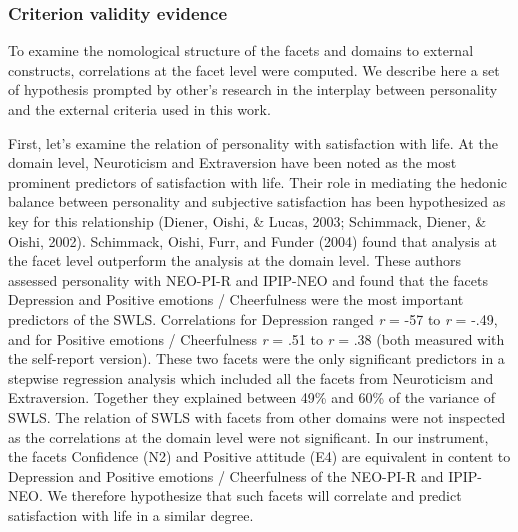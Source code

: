 \documentclass[,man]{apa6}
\theoremstyle{definition}
\theoremstyle{definition}
\theoremstyle{definition}
\theoremstyle{remark}
\begin{document}
\hypertarget{criterion-validity-evidence}{%
\subsubsection{Criterion validity
evidence}\label{criterion-validity-evidence}}

To examine the nomological structure of the facets and domains to
external constructs, correlations at the facet level were computed. We
describe here a set of hypothesis prompted by other's research in the
interplay between personality and the external criteria used in this
work.

First, let's examine the relation of personality with satisfaction with
life. At the domain level, Neuroticism and Extraversion have been noted
as the most prominent predictors of satisfaction with life. Their role
in mediating the hedonic balance between personality and subjective
satisfaction has been hypothesized as key for this relationship (Diener,
Oishi, \& Lucas, 2003; Schimmack, Diener, \& Oishi, 2002). Schimmack,
Oishi, Furr, and Funder (2004) found that analysis at the facet level
outperform the analysis at the domain level. These authors assessed
personality with NEO-PI-R and IPIP-NEO and found that the facets
Depression and Positive emotions / Cheerfulness were the most important
predictors of the SWLS. Correlations for Depression ranged \emph{r} =
-57 to \emph{r} = -.49, and for Positive emotions / Cheerfulness
\emph{r} = .51 to \emph{r} = .38 (both measured with the self-report
version). These two facets were the only significant predictors in a
stepwise regression analysis which included all the facets from
Neuroticism and Extraversion. Together they explained between 49\% and
60\% of the variance of SWLS. The relation of SWLS with facets from
other domains were not inspected as the correlations at the domain level
were not significant. In our instrument, the facets Confidence (N2) and
Positive attitude (E4) are equivalent in content to Depression and
Positive emotions / Cheerfulness of the NEO-PI-R and IPIP-NEO. We
therefore hypothesize that such facets will correlate and predict
satisfaction with life in a similar degree.
\end{document}
